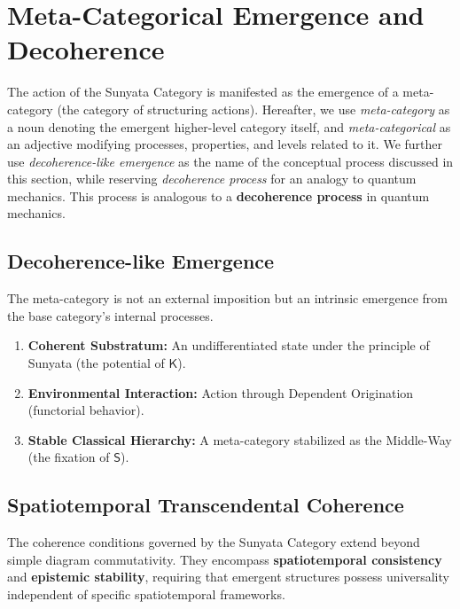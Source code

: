 \documentclass[12pt,a4paper]{article}
\begin{document}
\section{Meta-Categorical Emergence and Decoherence}
The action of the Sunyata Category is manifested as the emergence of a meta-category (the category of structuring actions). Hereafter, we use \textit{meta-category} as a noun denoting the emergent higher-level category itself, and \textit{meta-categorical} as an adjective modifying processes, properties, and levels related to it. We further use \textit{decoherence-like emergence} as the name of the conceptual process discussed in this section, while reserving \textit{decoherence process} for an analogy to quantum mechanics. This process is analogous to a \textbf{decoherence process} in quantum mechanics.

\subsection{Decoherence-like Emergence}
The meta-category is not an external imposition but an intrinsic emergence from the base category's internal processes.
\begin{enumerate}
    \item \textbf{Coherent Substratum:} An undifferentiated state under the principle of Sunyata (the potential of $\mathsf{K}$).
    \item \textbf{Environmental Interaction:} Action through Dependent Origination (functorial behavior).
    \item \textbf{Stable Classical Hierarchy:} A meta-category stabilized as the Middle-Way (the fixation of $\mathsf{S}$).
\end{enumerate}

\subsection{Spatiotemporal Transcendental Coherence}
The coherence conditions governed by the Sunyata Category extend beyond simple diagram commutativity. They encompass \textbf{spatiotemporal consistency} and \textbf{epistemic stability}, requiring that emergent structures possess universality independent of specific spatiotemporal frameworks.
\end{document}
